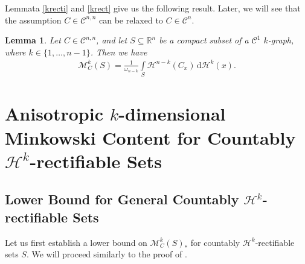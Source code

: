 \documentclass[pdflatex,sn-mathphys-num]{sn-jnl}
\theoremstyle{plain}
\newtheorem{lemma}[theorem]{Lemma}
\theoremstyle{definition}
\newcommand{\dH}[1]{\,\mathrm d\mathcal{H}^{#1}}
\begin{document}
 Lemmata \ref{krecti} and \ref{krect} give us the following result. Later, we will see that the assumption $C\in\mathcal{C}^{n, n}$ can be relaxed to $C\in\mathcal{C}^{n}$.
\begin{lemma}\label{krectif}
    Let $C\in\mathcal{C}^{n, n}$, and let $S\subseteq\mathbb{R}^n$ be a compact subset of a $\mathcal{C}^1$ $k$-graph, where $k\in\{1, \dots, n-1\}$. Then we have \begin{align*}
            \mathcal{M}^k_{C}(S)=\frac{1}{\omega_{n-k}}
            \int\limits_{S}\mathcal{H}^{n-k}(C_x)\dH{k}(x).
        \end{align*}
\end{lemma}

\section{Anisotropic $k$-dimensional Minkowski Content for Countably $\mathcal{H}^k$-rectifiable Sets}\label{count}
\subsection{Lower Bound for General Countably $\mathcal{H}^k$-rectifiable Sets} Let us first establish a lower bound on $\mathcal{M}^k_C(S)_*$ for countably $\mathcal{H}^k$-rectifiable sets $S$. We will proceed similarly to the proof of \cite[Lemma 6]{Rataj5}.
\end{document}
